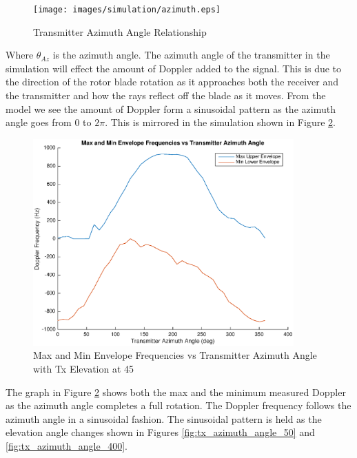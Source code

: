 \begin{figure}
	\begin{center}
		\texttt{[image: images/simulation/azimuth.eps]}
		\caption{Transmitter Azimuth Angle Relationship}
		\label{fig:tx_azimuth_rel}
	\end{center}
\end{figure}

Where $\theta_{Az}$ is the azimuth angle. The azimuth angle of the transmitter in the simulation will effect the amount of Doppler added to the signal. This is due to the direction of the rotor blade rotation as it approaches both the receiver and the transmitter and how the rays reflect off the blade as it moves. From the model we see the amount of Doppler form a sinusoidal pattern as the azimuth angle goes from $0$ to $2\pi$. This is mirrored in the simulation shown in Figure \ref{fig:tx_azimuth_angle_200}.

\begin{figure}
	\begin{center}
		\includegraphics[width=10cm]{images/simulation/Azimuth_angle_200_max_doppler.eps}
		\caption{Max and Min Envelope Frequencies vs Transmitter Azimuth Angle with Tx Elevation at 45\textdegree}
		\label{fig:tx_azimuth_angle_200}
	\end{center}
\end{figure}

The graph in Figure \ref{fig:tx_azimuth_angle_200} shows both the max and the minimum measured Doppler as the azimuth angle completes a full rotation. The Doppler frequency follows the azimuth angle in a sinusoidal fashion. The sinusoidal pattern is held as the elevation angle changes shown in Figures \ref{fig:tx_azimuth_angle_50} and \ref{fig:tx_azimuth_angle_400}.

